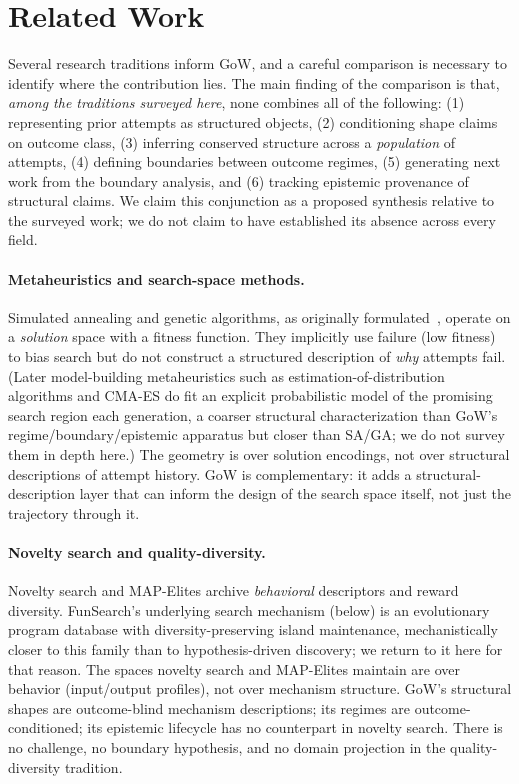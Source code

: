 \documentclass[11pt]{article}
\theoremstyle{gowthm}
\theoremstyle{gowplain}
\begin{document}
\section{Related Work}
\label{sec:related}

Several research traditions inform GoW, and a careful comparison is necessary
to identify where the contribution lies. The main finding of the comparison is
that, \emph{among the traditions surveyed here}, none combines all of the
following: (1) representing prior
attempts as structured objects, (2) conditioning shape claims on outcome class,
(3) inferring conserved structure across a \emph{population} of attempts, (4)
defining boundaries between outcome regimes, (5) generating next work from the
boundary analysis, and (6) tracking epistemic provenance of structural claims.
We claim this conjunction as a proposed synthesis relative to the surveyed
work; we do not claim to have established its absence across every field.

\paragraph{Metaheuristics and search-space methods.}
Simulated annealing and genetic algorithms, as originally
formulated~\citep{kirkpatrick1983optimization,
goldberg1989genetic}, operate on a
\emph{solution} space with a fitness function. They implicitly use failure (low fitness) to bias search
but do not construct a structured description of \emph{why} attempts fail.
(Later model-building metaheuristics such as estimation-of-distribution
algorithms and CMA-ES do fit an explicit probabilistic model of the
promising search region each generation, a coarser structural
characterization than GoW's regime/boundary/epistemic apparatus but closer
than SA/GA; we do not survey them in depth here.)
The geometry is over solution encodings, not over structural descriptions of
attempt history. GoW is complementary: it adds a structural-description layer
that can inform the design of the search space itself, not just the trajectory
through it.

\paragraph{Novelty search and quality-diversity.}
Novelty search \citep{lehman2011abandoning} and MAP-Elites \citep{mouret2015illuminating}
archive \emph{behavioral} descriptors and reward diversity. FunSearch's
underlying search mechanism (below) is an evolutionary program database with
diversity-preserving island maintenance, mechanistically closer to this
family than to hypothesis-driven discovery; we return to it here for that
reason. The spaces novelty search and MAP-Elites
maintain are over behavior (input/output profiles), not over mechanism structure.
GoW's structural shapes are outcome-blind mechanism descriptions; its regimes
are outcome-conditioned; its epistemic lifecycle has no counterpart in novelty
search. There is no challenge, no boundary hypothesis, and no domain projection
in the quality-diversity tradition.
\end{document}
